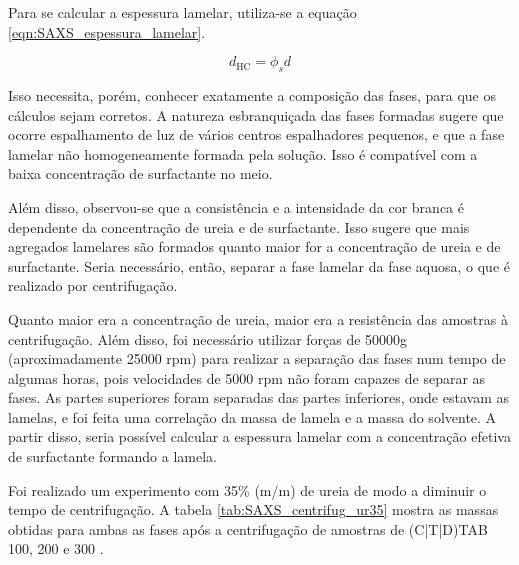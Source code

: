 	
	Para se calcular a espessura lamelar, utiliza-se a equação \ref{eqn:SAXS_espessura_lamelar}.
	
	\begin{equation} \label{eqn:SAXS_espessura_lamelar}
		d_{\text{HC}} = \phi_sd
	\end{equation}
	
	Isso necessita, porém, conhecer exatamente a composição das fases, para que os cálculos sejam corretos.	A natureza esbranquiçada das fases formadas sugere que ocorre espalhamento de luz de vários centros espalhadores pequenos, e que a fase lamelar não homogeneamente formada pela solução. Isso é compatível com a baixa concentração de surfactante no meio.
	
	Além disso, observou-se que a consistência e a intensidade da cor branca é dependente da concentração de ureia e de surfactante. Isso sugere que mais agregados lamelares são formados quanto maior for a concentração de ureia e de surfactante. Seria necessário, então, separar a fase lamelar da fase aquosa, o que é realizado por centrifugação.
	                   
	Quanto maior era a concentração de ureia, maior era a resistência das amostras à centrifugação. Além disso, foi necessário utilizar forças de 50000g (aproximadamente 25000 rpm) para realizar a separação das fases num tempo de algumas horas, pois velocidades de 5000 rpm não foram capazes de separar as fases. As partes superiores foram separadas das partes inferiores, onde estavam as lamelas, e foi feita uma correlação da massa de lamela e a massa do solvente. A partir disso, seria possível calcular a espessura lamelar com a concentração efetiva de surfactante formando a lamela.
	
	Foi realizado um experimento com 35\% (m/m) de ureia de modo a diminuir o tempo de centrifugação. A tabela \ref{tab:SAXS_centrifug_ur35} mostra as massas obtidas para ambas as fases após a centrifugação de amostras de (C|T|D)TAB 100, 200 e 300 \mM{}.
	
